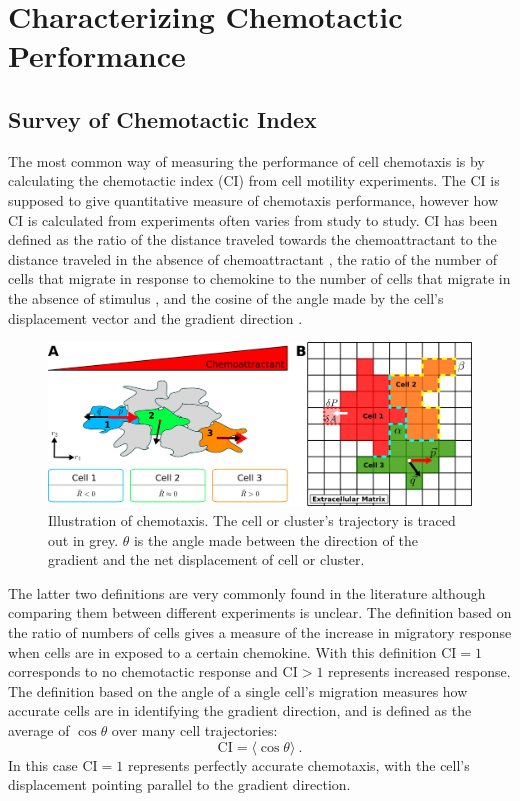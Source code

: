 
\chapter{Characterizing Chemotactic Performance}


\section{Survey of Chemotactic Index}

The most common way of measuring the performance of cell chemotaxis is by calculating the chemotactic index (CI) from cell motility experiments. The CI is supposed to give quantitative measure of chemotaxis performance, however how CI is calculated from experiments often varies from study to study. CI has been defined as the ratio of the distance traveled towards the chemoattractant to the distance traveled in the absence of chemoattractant \cite{nelson1975chemotaxis}, the ratio of the number of cells that migrate in response to chemokine to the number of cells that migrate in the absence of stimulus \cite{iellem2001unique,mayr2002vascular,fiedler2005vegf}, and the cosine of the angle made by the cell's displacement vector and the gradient direction
\cite{mouneimne2006spatial,kay2008changing,funamoto2001role}.

\begin{figure}
    \centering
        \includegraphics[width=.40\textwidth]{../fig/ch4_fig1.png}
    \caption{Illustration of chemotaxis. The cell or cluster's trajectory is traced out in grey. $\theta$ is the angle made between the direction of the gradient and the net displacement of cell or cluster.} \label{fig:ch4_f1}
\end{figure}

The latter two definitions are very commonly found in the literature although comparing them between different experiments is unclear. The definition based on the ratio of numbers of cells gives a measure of the increase in migratory response when cells are in exposed to a certain chemokine. With this definition $\text{CI} = 1$ corresponds to no chemotactic response and $\text{CI} > 1$ represents increased response. The definition based on the angle of a single cell's migration measures how accurate cells are in identifying the gradient direction, and is defined as the average of $\cos\theta$ over many cell trajectories:
\begin{equation}
    \text{CI} = \langle \cos\theta \rangle \ .
\end{equation}
In this case $\text{CI} = 1$ represents perfectly accurate chemotaxis, with the cell's displacement pointing parallel to the gradient direction.

